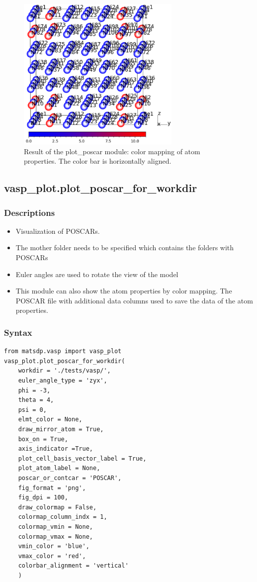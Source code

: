 \documentclass[12pt]{book}
\begin{document}
\begin{figure}[htbp]
\centering
\includegraphics[width=0.7\textwidth]{outputs_colormapping2.pdf}
\caption{Result of the plot\_poscar module: color mapping of atom properties. The color bar is horizontally aligned.}
\label{fig:outputs_colormapping2}
\end{figure}

\newpage

\subsection{vasp\_plot.plot\_poscar\_for\_workdir}
\subsubsection{Descriptions}
\begin{itemize}
\item Visualization of POSCARs. 
\item The mother folder needs to be specified which contains the folders with POSCARs
\item Euler angles are used to rotate the view of the model
\item This module can also show the atom properties by color mapping. The POSCAR file with additional data columns used to save the data of the atom properties.
\end{itemize}
\subsubsection{Syntax}
\begin{lstlisting}
from matsdp.vasp import vasp_plot
vasp_plot.plot_poscar_for_workdir(
    workdir = './tests/vasp/',
    euler_angle_type = 'zyx',
    phi = -3,
    theta = 4,
    psi = 0,
    elmt_color = None,
    draw_mirror_atom = True,
    box_on = True,
    axis_indicator =True,
    plot_cell_basis_vector_label = True,
    plot_atom_label = None,
    poscar_or_contcar = 'POSCAR',
    fig_format = 'png',
    fig_dpi = 100,
    draw_colormap = False,
    colormap_column_indx = 1,
    colormap_vmin = None,
    colormap_vmax = None,
    vmin_color = 'blue',
    vmax_color = 'red',
    colorbar_alignment = 'vertical'
    )
\end{lstlisting}
\end{document}
